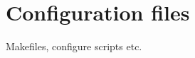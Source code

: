 \hypertarget{group__mpc55xx__config}{}\section{Configuration files}
\label{group__mpc55xx__config}
Makefiles, configure scripts etc. 
